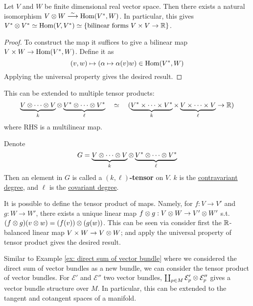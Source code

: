 \documentclass{article}
\begin{document}
\begin{proposition}
    Let $V$ and $W$ be finite dimensional real vector space. Then there exists a natural isomorphism $V \otimes W \overset{\sim}{\longrightarrow} \mathrm{Hom}(V^{\ast}, W)$. In particular, this gives $V^{\ast} \otimes V^{\ast} \simeq \mathrm{Hom}(V, V^{\ast}) \simeq \{\text{bilinear forms } V \times V \to \mathbb{R}\}$.
\end{proposition}

\begin{proof}
    To construct the map it suffices to give a bilinear map $V \times W \to \mathrm{Hom}(V^{\ast}, W)$. Define it as
    \[
        (v, w) \mapsto (\alpha \mapsto \alpha(v) w) \in \mathrm{Hom}(V^{\ast}, W)
    \]
    Applying the universal property gives the desired result. 
\end{proof}

\begin{remark}\label{rmk: tensor isomorphic to multilinear maps}
    This can be extended to multiple tensor products: 
    \[
        \underbrace{V \otimes \cdots \otimes V}_{k} \otimes \underbrace{V^{\ast} \otimes \cdots \otimes V^{\ast}}_{\ell} \quad \simeq \quad (\underbrace{V^{\ast} \times \cdots \times V^{\ast}}_{k} \times \underbrace{V \times \cdots \times V}_{\ell} \to \mathbb{R}) 
    \]
    where RHS is a multilinear map. 
\end{remark}

\begin{definition}[Tensor]
    Denote
    \[
        G = \underbrace{V \otimes \cdots \otimes V}_{k} \otimes \underbrace{V^{\ast} \otimes \cdots \otimes V^{\ast}}_{\ell}
    \]
    Then an element in $G$ is called a \textbf{$(k, \ell)$-tensor} on $V$. $k$ is the \underline{contravariant degree}, and $\ell$ is the \underline{covariant degree}.
\end{definition}

\begin{remark}
    It is possible to define the tensor product of maps. Namely, for $f: V \to V'$ and $g: W \to W'$, there exists a unique linear map $f \otimes g: V \otimes W \to V' \otimes W'$ s.t. $(f \otimes g) (v \otimes w) = (f(v)) \otimes (g(w))$. This can be seen via consider first the $\mathbb{R}$-balanced linear map $V \times W \to V \otimes W$; and apply the universal property of tensor product gives the desired result. 
\end{remark}

\begin{observation}
    Similar to Example \ref{ex: direct sum of vector bundle} where we considered the direct sum of vector bundles as a new bundle, we can consider the tensor product of vector bundles. For $\mathcal{E}'$ and $\mathcal{E}''$ two vector bundles, $\coprod_{p \in M} \mathcal{E}_p' \otimes \mathcal{E}_p''$ gives a vector bundle structure over $M$. In particular, this can be extended to the tangent and cotangent spaces of a manifold.
\end{observation}
\end{document}
